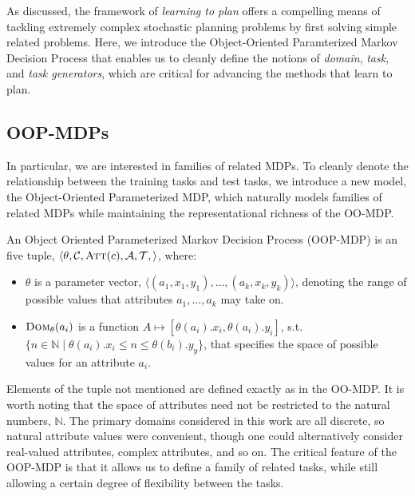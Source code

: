 \documentclass[11pt]{article}
\begin{document}
As discussed, the framework of {\it learning to plan} offers a compelling means of tackling extremely complex stochastic planning problems by first solving simple related problems. Here, we introduce the Object-Oriented Paramterized Markov Decision Process that enables us to cleanly define the notions of {\it domain}, {\it task}, and {\it task generators}, which are critical for advancing the methods that learn to plan.


\subsection{OOP-MDPs}
In particular, we are interested in families of related MDPs. To cleanly denote the relationship between the training tasks and test tasks, we introduce a new model, the Object-Oriented Parameterized MDP, which naturally models families of related MDPs while maintaining the representational richness of the OO-MDP. \\

{ An \textup{Object Oriented Parameterized Markov Decision Process (OOP-MDP)} is an five tuple, $\langle \theta, \mathcal{C}, \textsc{Att}(c),
\mathcal{A}, \mathcal{T}, \rangle$, where:

\begin{itemize}
\item $\theta$ is a parameter vector, $\langle (a_1, x_1, y_1), \ldots, (a_k, x_k, y_k) \rangle$, denoting the range of possible values that attributes $a_1, \ldots, a_k$ may take on.
\item $\textsc{Dom}_\theta(a_i)$ is a function $A \mapsto [\theta(a_i).x_i,\theta(a_i).y_i]$, s.t. $\{n \in \mathbb{N} \mid \theta(a_i).x_i \leq n \leq \theta(b_i).y_y \}$, that specifies the space of possible values for an attribute $a_i$.
\end{itemize}}

Elements of the tuple not mentioned are defined exactly as in the OO-MDP. It is worth noting that the space of attributes need not be restricted to the natural numbers, $\mathbb{N}$. The primary domains considered in this work are all discrete, so natural attribute values were convenient, though one could alternatively consider real-valued attributes, complex attributes, and so on. The critical feature of the OOP-MDP is that it allows us to define a family of related tasks, while still allowing a certain degree of flexibility between the tasks.
\end{document}
